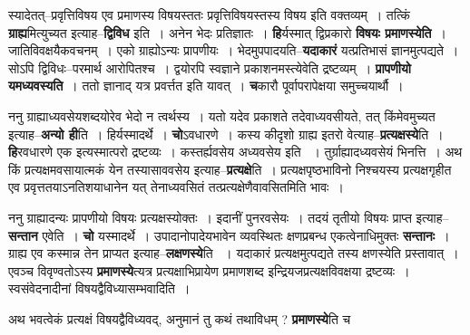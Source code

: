 \documentclass[article,12pt,a4paper]{memoir}
\begin{document}
	  \pstart स्यादेतत्--प्रवृत्तिविषय एव प्रमाणस्य विषयस्ततः प्रवृत्तिविषयस्तस्य विषय इति वक्तव्यम् । तत्किं \textbf{ग्राह्य}मित्युच्यत इत्याह--\textbf{द्विविध} इति । अनेन भेदः प्रतिज्ञातः । \textbf{हि}र्यस्मात् द्विप्रकारो \textbf{विषयः प्रमाणस्येति} । जातिविवक्षयैकवचनम् । एको ग्राह्योऽन्यः प्रापणीयः । भेदमुपपादयति--\textbf{यदाकारं} यत्प्रतिभासं ज्ञानमुत्पद्यते । सोऽपि द्विविधः--परमार्थ आरोपितश्च । द्वयोरपि स्वज्ञाने प्रकाशनमस्त्येवेति द्रष्टव्यम् । \textbf{प्रापणीयो यमध्यवस्यति} । ततो ज्ञानाद् यत्र प्रवर्त्तत इति यावत् । \textbf{च}कारौ पूर्वापरापेक्षया समुच्चयार्थौ ।
	\pend
      

	  \pstart ननु ग्राह्याध्यवसेयशब्दयोरेव भेदो न त्वर्थस्य । यतो यदेव प्रकाशते तदेवाध्यवसीयते, तत् किंमेवमुच्यत इत्याह--\textbf{अन्यो ही}ति । हिर्यस्मादर्थे । \textbf{चो}ऽवधारणे । कस्य कीदृशो ग्राह्य इतरो वेत्याह--\textbf{प्रत्यक्षस्ये}ति । \textbf{हि}रवधारणे एक इत्यस्मात्परो द्रष्टव्यः । कस्तर्ह्यवसेय अध्यवसेय इति \leavevmode{} । तुर्ग्राह्यादध्यवसेयं भिनत्ति । अथ किं प्रत्यक्षमवसायात्मकं येन तस्यासाववसेय इत्याह--\textbf{प्रत्यक्षे}ति । प्रत्यक्षपृष्ठभाविनो निश्चयस्य प्रत्यक्षगृहीत एव प्रवृत्ततयाऽनतिशयाधानेन यत् तेनाध्यवसितं तत्प्रत्यक्षेणैवावसितमिति भावः ।
	\pend
      

	  \pstart ननु ग्राह्यादन्यः प्रापणीयो विषयः प्रत्यक्षस्योक्तः । इदानीं पुनरवसेयः । तदयं तृतीयो विषयः प्राप्त इत्याह--\textbf{सन्तान} एवेति । \textbf{चो} यस्मादर्थे । उपादानोपादेयभावेन व्यवस्थितः क्षणप्रबन्ध एकत्वेनाधिमुक्तः \textbf{सन्तानः} । ग्राह्य एव कस्मान्न तेन प्राप्यत इत्याह--\textbf{लक्षणस्ये}ति  । यदाकारं प्रत्यक्षमुत्पद्यते तस्य क्षणस्येति प्रस्तावात् । एवञ्च विवृण्वतोऽस्य \textbf{प्रमाणस्ये}त्यत्र प्रत्यक्षाभिप्रायेण प्रमाणशब्द इन्द्रियजप्रत्यक्षविवक्षया द्रष्टव्यः । स्वसंवेदनादीनां विषयद्वैविध्यासम्भवादिति ।
	\pend
      

	  \pstart अथ भवत्वेकं प्रत्यक्षं विषयद्वैविध्यवद्, अनुमानं तु कथं तथाविधम् ? \textbf{प्रमाणस्ये}ति च  \leavevmode{} 
	  
\end{document}

